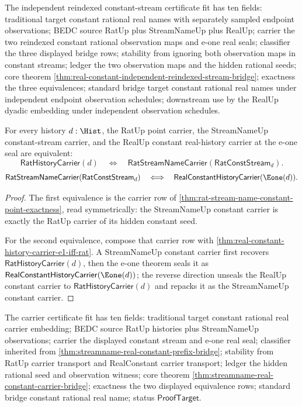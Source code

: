 
The independent reindexed constant-stream certificate fit has ten fields:
traditional target constant rational real names with separately sampled
endpoint observations; BEDC source RatUp plus StreamNameUp plus RealUp; carrier
the two reindexed constant rational observation maps and e-one real seals;
classifier the three displayed bridge rows; stability from ignoring both
observation maps in constant streams; ledger the two observation maps and the
hidden rational seeds; core theorem
\autoref{thm:real-constant-independent-reindexed-stream-bridge}; exactness the
three equivalences; standard bridge target constant rational real names under
independent endpoint observation schedules; downstream use by the RealUp dyadic
embedding under independent observation schedules.

\begin{theorem}
\label{thm:streamname-real-constant-carrier-bridge}
For every history $d:\Hist$, the RatUp point carrier, the StreamNameUp
constant-stream carrier, and the RealUp constant real-history carrier at the
e-one seal are equivalent:
$$
\mathsf{RatHistoryCarrier}(d)
\quad\Longleftrightarrow\quad
\mathsf{RatStreamNameCarrier}(\mathsf{RatConstStream}_d).
$$
$$
\mathsf{RatStreamNameCarrier}(\mathsf{RatConstStream}_d)
\quad\Longleftrightarrow\quad
\mathsf{RealConstantHistoryCarrier}(\Eone(d)).
$$
\end{theorem}
\begin{proof}
The first equivalence is the carrier row of
\autoref{thm:rat-stream-name-constant-point-exactness}, read symmetrically:
the StreamNameUp constant carrier is exactly the RatUp carrier of its hidden
constant seed.

For the second equivalence, compose that carrier row with
\autoref{thm:real-constant-history-carrier-e1-iff-rat}. A StreamNameUp
constant carrier first recovers $\mathsf{RatHistoryCarrier}(d)$, then the
e-one theorem seals it as
$\mathsf{RealConstantHistoryCarrier}(\Eone(d))$; the reverse direction unseals
the RealUp constant carrier to $\mathsf{RatHistoryCarrier}(d)$ and repacks it
as the StreamNameUp constant carrier.
\end{proof}

The carrier certificate fit has ten fields: traditional target constant
rational real carrier embedding; BEDC source RatUp histories plus StreamNameUp
observations; carrier the displayed constant stream and e-one real seal;
classifier inherited from \autoref{thm:streamname-real-constant-prefix-bridge};
stability from RatUp carrier transport and RealConstant carrier transport;
ledger the hidden rational seed and observation witness; core theorem
\autoref{thm:streamname-real-constant-carrier-bridge}; exactness the two
displayed equivalence rows; standard bridge constant rational real name; status
$\mathsf{ProofTarget}$.

